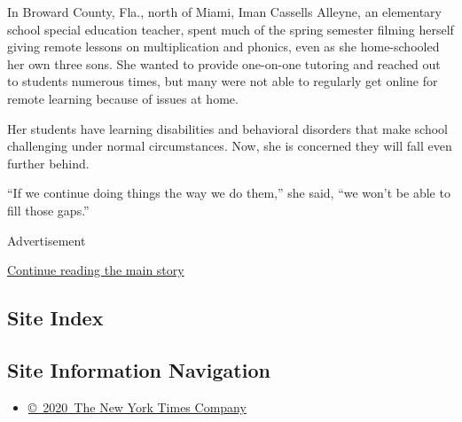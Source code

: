 In Broward County, Fla., north of Miami, Iman Cassells Alleyne, an
elementary school special education teacher, spent much of the spring
semester filming herself giving remote lessons on multiplication and
phonics, even as she home-schooled her own three sons. She wanted to
provide one-on-one tutoring and reached out to students numerous times,
but many were not able to regularly get online for remote learning
because of issues at home.

Her students have learning disabilities and behavioral disorders that
make school challenging under normal circumstances. Now, she is
concerned they will fall even further behind.

``If we continue doing things the way we do them,'' she said, ``we won't
be able to fill those gaps.''

Advertisement

\protect\hyperlink{after-bottom}{Continue reading the main story}

\hypertarget{site-index}{%
\subsection{Site Index}\label{site-index}}

\hypertarget{site-information-navigation}{%
\subsection{Site Information
Navigation}\label{site-information-navigation}}

\begin{itemize}
\tightlist
\item
  \href{https://help.nytimes3xbfgragh.onion/hc/en-us/articles/115014792127-Copyright-notice}{©~2020~The
  New York Times Company}
\end{itemize}

